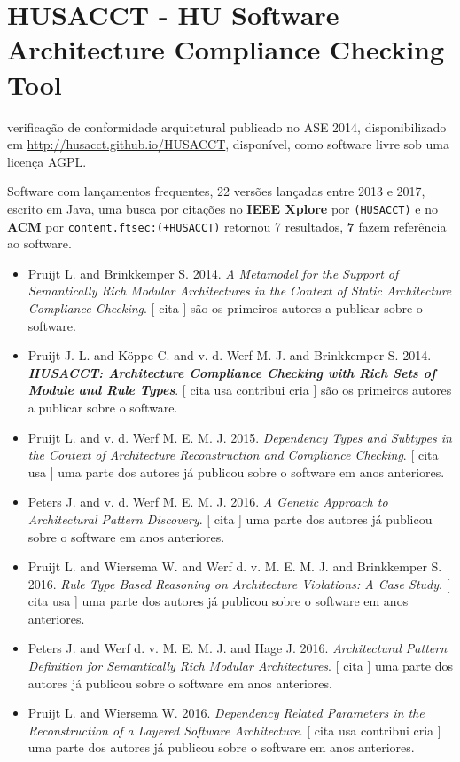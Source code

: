 \section{HUSACCT - HU Software Architecture Compliance Checking Tool}

verificação de conformidade arquitetural
publicado no ASE 2014,
disponibilizado em \url{http://husacct.github.io/HUSACCT},
disponível,
como software livre
sob uma licença AGPL.

Software com lançamentos frequentes,
22 versões lançadas
entre 2013 e 2017,
escrito em Java,
uma busca por citações no {\bf IEEE Xplore} por
\texttt{(HUSACCT)}
e no {\bf ACM} por
\texttt{content.ftsec:(+HUSACCT)}
retornou
7 resultados,
{\bf 7} fazem referência ao software.

\begin{itemize}
\item Pruijt L. and Brinkkemper S.
      2014.
        \textit{ A Metamodel for the Support of Semantically Rich Modular Architectures in the Context of Static Architecture Compliance Checking}.
      [
          cita
      ]
são os primeiros autores a publicar sobre o software.
\item Pruijt J. L. and K\"{o}ppe C. and v. d. Werf M. J. and Brinkkemper S.
      2014.
        \textbf{\textit{ HUSACCT: Architecture Compliance Checking with Rich Sets of Module and Rule Types}}.
      [
          cita
          usa
          contribui
          cria
      ]
são os primeiros autores a publicar sobre o software.
\item Pruijt L. and v. d. Werf M. E. M. J.
      2015.
        \textit{ Dependency Types and Subtypes in the Context of Architecture Reconstruction and Compliance Checking}.
      [
          cita
          usa
      ]
uma parte dos autores já publicou sobre o software em anos anteriores.
\item Peters J. and v. d. Werf M. E. M. J.
      2016.
        \textit{ A Genetic Approach to Architectural Pattern Discovery}.
      [
          cita
      ]
uma parte dos autores já publicou sobre o software em anos anteriores.
\item Pruijt L. and Wiersema W. and Werf d. v. M. E. M. J. and Brinkkemper S.
      2016.
        \textit{ Rule Type Based Reasoning on Architecture Violations: A Case Study}.
      [
          cita
          usa
      ]
uma parte dos autores já publicou sobre o software em anos anteriores.
\item Peters J. and Werf d. v. M. E. M. J. and Hage J.
      2016.
        \textit{ Architectural Pattern Definition for Semantically Rich Modular Architectures}.
      [
          cita
      ]
uma parte dos autores já publicou sobre o software em anos anteriores.
\item Pruijt L. and Wiersema W.
      2016.
        \textit{ Dependency Related Parameters in the Reconstruction of a Layered Software Architecture}.
      [
          cita
          usa
          contribui
          cria
      ]
uma parte dos autores já publicou sobre o software em anos anteriores.
\end{itemize}
